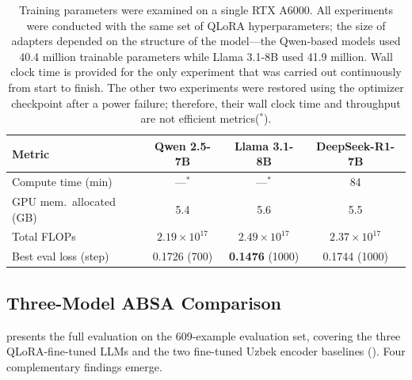 \documentclass[bdcc,article,submit,moreauthors]{Definitions/mdpi}
\begin{document}
\begin{table}[t]
\centering
\caption{Training parameters were examined on a single RTX A6000. All experiments were conducted with the same set of QLoRA hyperparameters; the size of adapters depended on the structure of the model—the Qwen-based models used 40.4 million trainable parameters while Llama 3.1-8B used 41.9 million. Wall clock time is provided for the only experiment that was carried out continuously from start to finish. The other two experiments were restored using the optimizer checkpoint after a power failure; therefore, their wall clock time and throughput are not efficient metrics($^{*}$).}
\label{tab:train_efficiency}
\setlength{\tabcolsep}{4pt}
\begin{tabular}{lccc}
\toprule
\textbf{Metric} & \textbf{Qwen 2.5-7B} & \textbf{Llama 3.1-8B} & \textbf{DeepSeek-R1-7B} \\
\midrule
Compute time (min)       & ---$^{*}$   & ---$^{*}$   & 84   \\
GPU mem.\ allocated (GB) & 5.4  & 5.6  & 5.5  \\
Total FLOPs              & $2.19\!\times\!10^{17}$ & $2.49\!\times\!10^{17}$ & $2.37\!\times\!10^{17}$ \\
Best eval loss (step)    & 0.1726 (700) & \textbf{0.1476} (1000) & 0.1744 (1000) \\
\bottomrule
\end{tabular}
\end{table}

\subsection{Three-Model ABSA Comparison}
\label{sec:res_comparison}

 presents the full evaluation on the 609-example evaluation set, covering the three QLoRA-fine-tuned LLMs and the two fine-tuned Uzbek encoder baselines (). Four complementary findings emerge.
\end{document}
